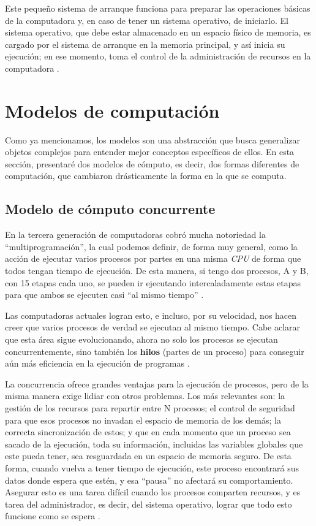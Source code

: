 \documentclass[letterpaper,12pt,oneside]{book}
\begin{document}
		Este pequeño sistema de arranque funciona para preparar las operaciones básicas de la computadora y, en caso de tener un sistema operativo,
		de iniciarlo. El sistema operativo, que debe estar almacenado en un espacio físico de memoria, es cargado por el sistema de arranque en la memoria
		principal, y así inicia su ejecución; en ese momento, toma el control de la administración de recursos en la computadora \cite{tanenbaum_modern_2002}.

		\clearpage		
		
\section{Modelos de computación}
        
        Como ya mencionamos, los modelos son una abstracción que busca
        generalizar objetos complejos para entender mejor
        conceptos específicos de ellos. En esta sección, presentaré
        dos modelos de cómputo, es decir, dos formas diferentes de computación, que cambiaron drásticamente la forma en la que se computa.

		\subsection{Modelo de cómputo concurrente}
  
		En la tercera generación de computadoras cobró mucha notoriedad la ``multiprogramación'', la cual podemos definir, de forma muy general, como la acción de ejecutar varios procesos por partes en una misma \textit{CPU}
		de forma que todos tengan tiempo de ejecución. De esta manera, si tengo dos procesos, A y B, con 15 etapas cada uno, se pueden ir ejecutando
		intercaladamente estas etapas para que ambos se ejecuten casi ``al mismo tiempo'' \cite{tanenbaum_modern_2002}.
  
        Las computadoras actuales logran esto, e incluso,
		por su velocidad, nos hacen creer que varios procesos de verdad se ejecutan al mismo tiempo. Cabe aclarar que esta área sigue evolucionando,
		ahora no solo los procesos se ejecutan concurrentemente, sino también los \textbf{hilos} (partes de un proceso) para conseguir aún más eficiencia en la ejecución de programas \cite{tanenbaum_modern_2002}.
		
		La concurrencia ofrece grandes ventajas para la ejecución de procesos, pero de la misma manera exige lidiar con otros problemas. Los más relevantes son: la gestión de los recursos para repartir entre N procesos; el control de seguridad para que esos procesos no invadan el espacio de memoria
		de los demás; la correcta sincronización de estos; y que en cada momento que un proceso sea sacado de la ejecución, toda su información, incluidas las variables globales
		que este pueda tener, sea resguardada en un espacio de memoria seguro. De esta forma, cuando vuelva a tener tiempo de ejecución, este proceso encontrará sus datos donde espera que estén, y esa ``pausa'' no afectará su comportamiento. Asegurar esto es una
		tarea difícil cuando los procesos comparten recursos, y es tarea del administrador, es decir, del sistema operativo,
		lograr que todo esto funcione como se espera \cite{leslie_lamport_computer_2015}.
		
\end{document}

